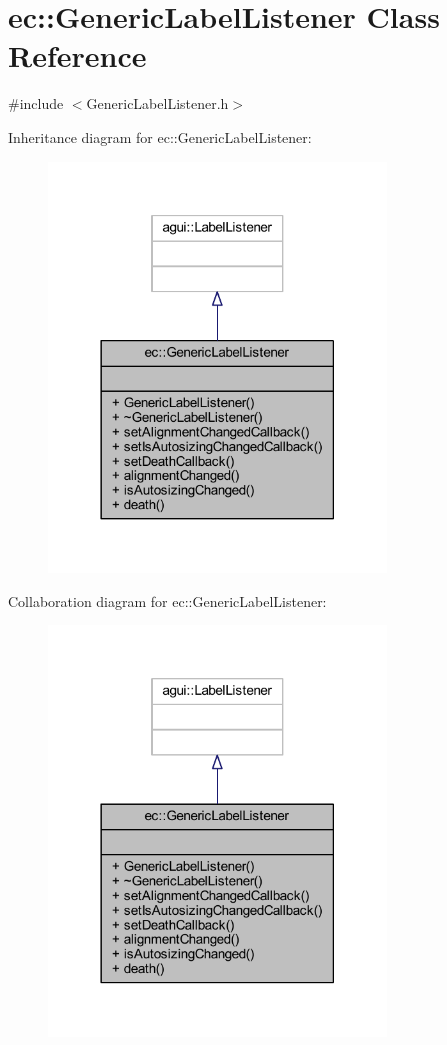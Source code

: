 \hypertarget{classec_1_1_generic_label_listener}{}\section{ec\+:\+:Generic\+Label\+Listener Class Reference}
\label{classec_1_1_generic_label_listener}


{\ttfamily \#include $<$Generic\+Label\+Listener.\+h$>$}



Inheritance diagram for ec\+:\+:Generic\+Label\+Listener\+:\nopagebreak
\begin{figure}[H]
\begin{center}
\leavevmode
\includegraphics[width=254pt]{classec_1_1_generic_label_listener__inherit__graph}
\end{center}
\end{figure}


Collaboration diagram for ec\+:\+:Generic\+Label\+Listener\+:\nopagebreak
\begin{figure}[H]
\begin{center}
\leavevmode
\includegraphics[width=254pt]{classec_1_1_generic_label_listener__coll__graph}
\end{center}
\end{figure}
